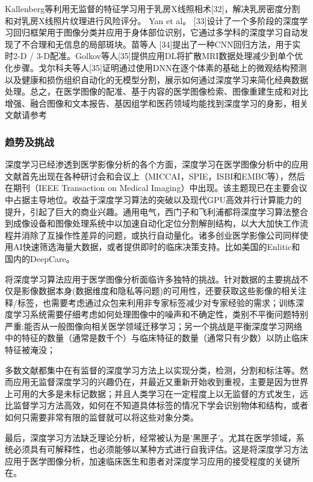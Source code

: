 {Kallenberg等利用无监督的特征学习用于乳房X线照相术[32]，解决乳房密度分割和对乳房X线照片纹理进行风险评分。 Yan et al。 [33]设计了一个多阶段的深度学习回归框架用于图像分类并应用于身体部位识别，它通过多学科的深度学习自动发现了不合理和无信息的局部斑块。苗等人 [34]提出了一种CNN回归方法，用于实时2-D / 3-D配准。Golkov等人[35]提供应用DL将扩散MRI数据处理减少到单个优化步骤。戈尔科夫等人[35]证明通过使用DNN在逐个体素的基础上的微观结构预测以及健康和损伤组织自动化的无模型分割，展示如何通过深度学习来简化经典数据处理。总之，在医学图像的配准、基于内容的医学图像检索、图像重建生成和对比增强、融合图像和文本报告、基因组学和医药领域均能找到深度学习的身影，相关文献请参考

\subsubsection{趋势及挑战}

深度学习已经渗透到医学影像分析的各个方面，深度学习在医学图像分析中的应用文献首先出现在各种研讨会和会议上（MICCAI，SPIE，ISBI和EMBC等），然后在期刊（IEEE Transaction on Medical Imaging）中出现。该主题现已在主要会议中占据主导地位。收益于深度学习算法的突破以及现代GPU高效并行计算能力的提升，引起了巨大的商业兴趣。通用电气，西门子和飞利浦都将深度学习算法整合到成像设备和图像处理系统中以加速自动化定位分割解剖结构，以大大加快工作流程并消除了互操作性差异的问题，或执行自动量化。诸多创业医学影像公司同样使用AI快速筛选海量大数据，或者提供即时的临床决策支持。比如美国的Enlitic和国内的DeepCare。

将深度学习算法应用于医学图像分析面临许多独特的挑战。针对数据的主要挑战不仅是影像数据本身(数据维度和隐私等问题)的可用性，还要获取这些影像的相关注释/标签，也需要考虑通过众包来利用非专家标签减少对专家经验的需求；训练深度学习系统需要仔细考虑如何处理图像中的噪声和不确定性，类别不平衡问题特别严重;能否从一般图像向相关医学领域迁移学习；另一个挑战是平衡深度学习网络中的特征的数量（通常是数千个）与临床特征的数量（通常只有少数）以防止临床特征被淹没； 

多数文献都集中在有监督的深度学习方法上以实现分类，检测，分割和标注等。然而应用无监督深度学习的兴趣仍在，并最近又重新开始收到重视，主要是因为世界上可用的大多是未标记数据；并且人类学习在一定程度上以无监督的方式发生，远比监督学习方法高效，如何在不知道具体标签的情况下学会识别物体和结构，或者如何只需要非常有限的监督就可以将这些对象分类。

最后，深度学习方法缺乏理论分析，经常被认为是'黑匣子'。尤其在医学领域，系统必须具有可解释性，也必须能够以某种方式进行自我评估。这是将深度学习方法应用于医学图像分析，加速临床医生和患者对深度学习应用的接受程度的关键所在。

}
